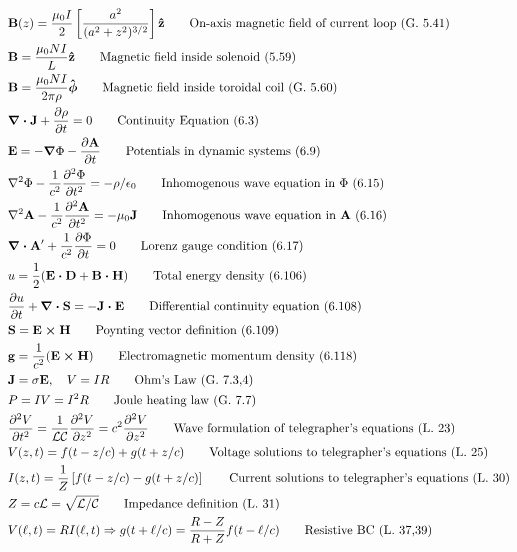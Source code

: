 \documentclass[10pt]{article}
\newcommand{\zhat}{\boldsymbol{\hat{\textbf{z}}}}
\newcommand{\phihat}{\boldsymbol{\hat{\textbf{$\phi$}}}}
\newcommand{\ve}[1]{\boldsymbol{\mathbf{#1}}}
\newcommand{\eo}{\epsilon_0}
\newcommand{\pder}[2]{\frac{\partial #1}{\partial #2}}
\newcommand{\dpder}[2]{\frac{\partial^2 #1}{\partial #2^2}}
\newcommand{\lrb}[1]{\left[ #1 \right]}
\begin{document}
\begin{multicols}{2}
\begin{align*}
		& \ve{B}(z) = \frac{\mu_0 I}{2} \lrb{ \frac{a^2}{(a^2 + z^2)^{3/2}} }\zhat \tag*{On-axis magnetic field of current loop (G. 5.41)} \\
		& \ve{B} = \frac{\mu_0 N I}{L} \zhat \tag*{Magnetic field inside solenoid (5.59)} \\
		& \ve{B} = \frac{\mu_0 N I}{2 \pi \rho} \phihat \tag*{Magnetic field inside toroidal coil (G. 5.60)} \\
		& \ve{\nabla \cdot J} + \pder{\rho}{t} = 0 \tag*{Continuity Equation (6.3)} \\
		& \ve{E} = -\ve{\nabla} \Phi - \pder{\ve{A}}{t} \tag*{Potentials in dynamic systems (6.9)} \\
		& \nabla^2 \Phi - \frac{1}{c^2} \dpder{\Phi}{t} = -\rho / \eo \tag*{Inhomogenous wave equation in $\Phi$ (6.15)} \\
		& \nabla^2 \ve{A} - \frac{1}{c^2} \dpder{\ve{A}}{t} = -\mu_0 \ve{J} \tag*{Inhomogenous wave equation in $\ve{A}$ (6.16)} \\
		& \ve{\nabla \cdot A}' + \frac{1}{c^2} \pder{\Phi}{t} = 0 \tag*{Lorenz gauge condition (6.17)} \\
		& u = \frac{1}{2}(\ve{E \cdot D} + \ve{B \cdot H}) \tag*{Total energy density (6.106)} \\
		& \pder{u}{t} + \ve{\nabla \cdot S} = - \ve{J \cdot E} \tag*{Differential continuity equation (6.108)} \\
		& \ve{S} = \ve{E \times H} \tag*{Poynting vector definition (6.109)} \\
		& \ve{g} = \frac{1}{c^2} (\ve{E \times H}) \tag*{Electromagnetic momentum density (6.118)} \\
		& \ve{J} = \sigma \ve{E}, \quad V = IR \tag*{Ohm's Law (G. 7.3,4)} \\
		& P = IV = I^2 R \tag*{Joule heating law (G. 7.7)} \\
		& \dpder{V}{t} = \frac{1}{\mathcal{LC}} \dpder{V}{z} = c^2 \dpder{V}{z} \tag*{Wave formulation of telegrapher's equations (L. 23)} \\
		& V(z,t) = f(t-z/c) + g(t+z/c) \tag*{Voltage solutions to telegrapher's equations (L. 25)} \\
		& I(z,t) = \frac{1}{Z} \lrb{f(t-z/c) - g(t+z/c)} \tag*{Current solutions to telegrapher's equations (L. 30)} \\
		& Z = c \mathcal{L} = \sqrt{\mathcal{L}/\mathcal{C}} \tag*{Impedance definition (L. 31)} \\
		& V(\ell,t) = R I(\ell,t) \Rightarrow g(t+\ell/c) = \frac{R-Z}{R+Z} f(t-\ell/c) \tag*{Resistive BC (L. 37,39)}\\

\end{align*}
\end{multicols}
\end{document}

